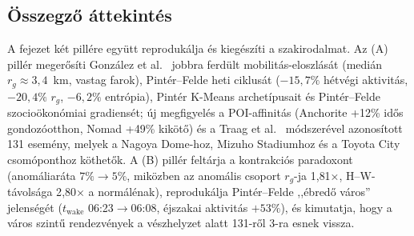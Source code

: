 \subsection{Összegző áttekintés}
\label{subsec:eredmenyek_osszegzo}

A fejezet két pillére együtt reprodukálja és kiegészíti a szakirodalmat. Az (A) pillér megerősíti González et al.\ \cite{gonzalez2008understanding} jobbra ferdült mobilitás-eloszlását (medián $r_g\!\approx\!3{,}4$~km, vastag farok), Pintér--Felde \cite{pinter2022awakening} heti ciklusát ($-15{,}7\%$ hétvégi aktivitás, $-20{,}4\%$ $r_g$, $-6{,}2\%$ entrópia), Pintér \cite{pinter2020artificial} K-Means archetípusait és Pintér--Felde \cite{pinter2021evaluating} szocioökonómiai gradiensét; új megfigyelés a POI-affinitás (Anchorite +12\% idős gondozóotthon, Nomad +49\% kikötő) és a Traag et al.\ \cite{traag2011social} módszerével azonosított 131 esemény, melyek a Nagoya Dome-hoz, Mizuho Stadiumhoz és a Toyota City csomóponthoz köthetők. A (B) pillér feltárja a kontrakciós paradoxont (anomáliaráta $7\%\!\to\!5\%$, miközben az anomális csoport $r_g$-ja 1{,}81×, H--W-távolsága 2{,}80× a normálénak), reprodukálja Pintér--Felde \cite{pinter2022awakening} ,,ébredő város'' jelenségét ($t_\mathrm{wake}$ 06:23$\to$06:08, éjszakai aktivitás $+53\%$), és kimutatja, hogy a város szintű rendezvények a vészhelyzet alatt 131-ről 3-ra esnek vissza.

